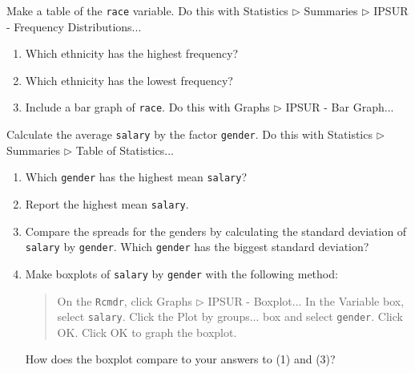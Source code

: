 \documentclass[captions=tableheading]{scrbook}
\begin{document}
\begin{xca}
Make a table of the \texttt{race} variable. Do this with \textsf{Statistics} \textsf{\(\triangleright\) Summaries} \textsf{\(\triangleright\) IPSUR - Frequency Distributions}...

\begin{enumerate}
\item Which ethnicity has the highest frequency?
\item Which ethnicity has the lowest frequency?
\item Include a bar graph of \texttt{race}. Do this with \textsf{Graphs} \textsf{\(\triangleright\)} \textsf{IPSUR - Bar Graph}...
\end{enumerate}

\end{xca}

\begin{xca}
Calculate the average \texttt{salary} by the factor \texttt{gender}. Do this with \textsf{Statistics} \textsf{\(\triangleright\) Summaries} \textsf{\(\triangleright\) Table of Statistics}... 
\begin{enumerate}
\item Which \texttt{gender} has the highest mean \texttt{salary}?
\item Report the highest mean \texttt{salary}.
\item Compare the spreads for the genders by calculating the standard deviation of \texttt{salary} by \texttt{gender}. Which \texttt{gender} has the biggest standard deviation?
\item Make boxplots of \texttt{salary} by \texttt{gender} with the following method:
   \begin{quote}
   On the \texttt{Rcmdr}, click \textsf{Graphs} \textsf{\(\triangleright\)} \textsf{IPSUR - Boxplot}...
   In the \textsf{Variable} box, select \texttt{salary}.
   Click the \textsf{Plot by groups}... box and select \texttt{gender}. Click \textsf{OK}.
   Click \textsf{OK} to graph the boxplot.
   \end{quote}
   How does the boxplot compare to your answers to (1) and (3)?
\end{enumerate}
\end{xca}
\end{document}
